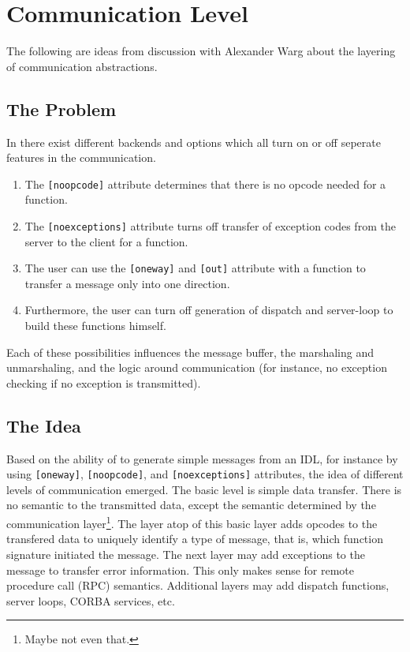 \section{Communication Level}

The following are ideas from discussion with Alexander Warg
about the layering of communication abstractions.

\subsection{The Problem}
In \dice{} there exist different backends and options which all turn on or
off seperate features in the communication.  
\begin{enumerate}
\item The \verb|[noopcode]| attribute determines that there is no opcode 
      needed for a function.  
      
\item The \verb|[noexceptions]| attribute turns off transfer of exception 
      codes from the server to the client for a function.

\item The user can use the \verb|[oneway]| and \verb|[out]| attribute with a
      function to transfer a message only into one direction.
      
\item Furthermore, the user can turn off generation of dispatch and 
      server-loop to build these functions himself.

\end{enumerate}

Each of these possibilities influences the message buffer, the marshaling and
unmarshaling, and the logic around communication (for instance, no exception
checking if no exception is transmitted).

\subsection{The Idea}
Based on the ability of \dice{} to generate simple messages from an IDL, for 
instance by using \verb|[oneway]|, \verb|[noopcode]|, and \verb|[noexceptions]|
attributes, the idea of different levels of communication emerged.  The basic
level is simple data transfer.  There is no semantic to the transmitted data,
except the semantic determined by the communication layer\footnote{Maybe not
even that.}.  The layer atop of this basic layer adds opcodes to the transfered
data to uniquely identify a type of message, that is, which function signature
initiated the message.  The next layer may add exceptions to the message to
transfer error information.  This only makes sense for remote procedure call 
(RPC) semantics.  Additional layers may add dispatch functions, server loops,
CORBA services, etc.

